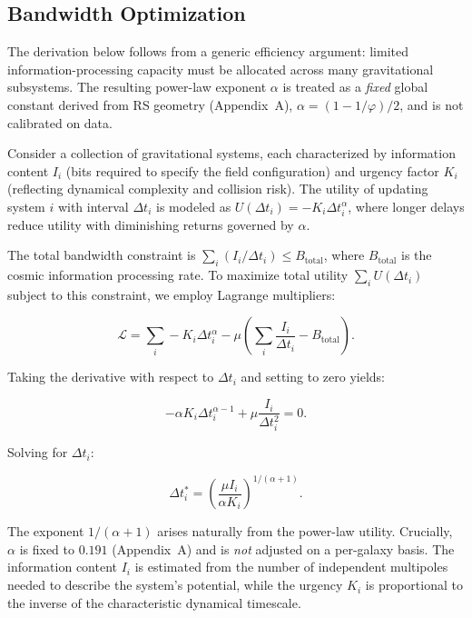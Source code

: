 \documentclass[usenatbib]{mnras}
\begin{document}
\subsection{Bandwidth Optimization}

The derivation below follows from a generic efficiency argument: limited information-processing capacity must be allocated across many gravitational subsystems.  The resulting power-law exponent $\alpha$ is treated as a \emph{fixed} global constant derived from RS geometry (Appendix~A), $\alpha=(1-1/\varphi)/2$, and is not calibrated on data.

Consider a collection of gravitational systems, each characterized by information content $I_i$ (bits required to specify the field configuration) and urgency factor $K_i$ (reflecting dynamical complexity and collision risk). The utility of updating system $i$ with interval $\Delta t_i$ is modeled as $U(\Delta t_i) = -K_i \Delta t_i^\alpha$, where longer delays reduce utility with diminishing returns governed by $\alpha$.

The total bandwidth constraint is $\sum_i (I_i / \Delta t_i) \leq B_\mathrm{total}$, where $B_\mathrm{total}$ is the cosmic information processing rate. To maximize total utility $\sum_i U(\Delta t_i)$ subject to this constraint, we employ Lagrange multipliers:

\begin{equation}
\mathcal{L} = \sum_i -K_i \Delta t_i^\alpha - \mu \left( \sum_i \frac{I_i}{\Delta t_i} - B_\mathrm{total} \right).
\end{equation}

Taking the derivative with respect to $\Delta t_i$ and setting to zero yields:

\begin{equation}
-\alpha K_i \Delta t_i^{\alpha-1} + \mu \frac{I_i}{\Delta t_i^2} = 0.
\end{equation}

Solving for $\Delta t_i$:

\begin{equation}
\Delta t_i^* = \left( \frac{\mu I_i}{\alpha K_i} \right)^{1/(\alpha+1)}.
\end{equation}

The exponent $1/(\alpha+1)$ arises naturally from the power-law utility. Crucially, $\alpha$ is fixed to $0.191$ (Appendix~A) and is \emph{not} adjusted on a per-galaxy basis. The information content $I_i$ is estimated from the number of independent multipoles needed to describe the system's potential, while the urgency $K_i$ is proportional to the inverse of the characteristic dynamical timescale.
\end{document}
